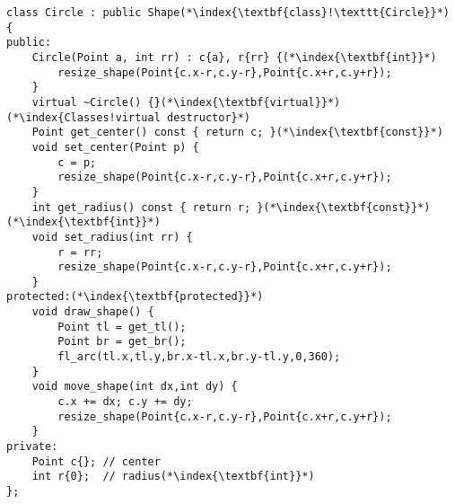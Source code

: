 \documentclass[10pt]{article}
\begin{document}
\begin{lstlisting}
class Circle : public Shape(*\index{\textbf{class}!\texttt{Circle}}*)
{
public:
    Circle(Point a, int rr) : c{a}, r{rr} {(*\index{\textbf{int}}*)
        resize_shape(Point{c.x-r,c.y-r},Point{c.x+r,c.y+r});
    }
    virtual ~Circle() {}(*\index{\textbf{virtual}}*)(*\index{Classes!virtual destructor}*)
    Point get_center() const { return c; }(*\index{\textbf{const}}*)
    void set_center(Point p) {
        c = p;
        resize_shape(Point{c.x-r,c.y-r},Point{c.x+r,c.y+r});
    }
    int get_radius() const { return r; }(*\index{\textbf{const}}*)(*\index{\textbf{int}}*)
    void set_radius(int rr) {
        r = rr;
        resize_shape(Point{c.x-r,c.y-r},Point{c.x+r,c.y+r});
    }
protected:(*\index{\textbf{protected}}*)
    void draw_shape() {
        Point tl = get_tl();
        Point br = get_br();
        fl_arc(tl.x,tl.y,br.x-tl.x,br.y-tl.y,0,360);
    }
    void move_shape(int dx,int dy) {
        c.x += dx; c.y += dy;
        resize_shape(Point{c.x-r,c.y-r},Point{c.x+r,c.y+r});
    }
private:
    Point c{}; // center
    int r{0};  // radius(*\index{\textbf{int}}*)
};
\end{lstlisting}
%
%
\end{document}
